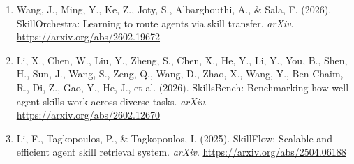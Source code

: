 \documentclass[11pt]{article}
\begin{document}
\begin{enumerate}
\item Wang, J., Ming, Y., Ke, Z., Joty, S., Albarghouthi, A., \& Sala, F. (2026). SkillOrchestra: Learning to route agents via skill transfer. \textit{arXiv}. \url{https://arxiv.org/abs/2602.19672}

\item Li, X., Chen, W., Liu, Y., Zheng, S., Chen, X., He, Y., Li, Y., You, B., Shen, H., Sun, J., Wang, S., Zeng, Q., Wang, D., Zhao, X., Wang, Y., Ben Chaim, R., Di, Z., Gao, Y., He, J., et al. (2026). SkillsBench: Benchmarking how well agent skills work across diverse tasks. \textit{arXiv}. \url{https://arxiv.org/abs/2602.12670}

\item Li, F., Tagkopoulos, P., \& Tagkopoulos, I. (2025). SkillFlow: Scalable and efficient agent skill retrieval system. \textit{arXiv}. \url{https://arxiv.org/abs/2504.06188}
\end{enumerate}
\clearpage
\appendix

\end{document}
